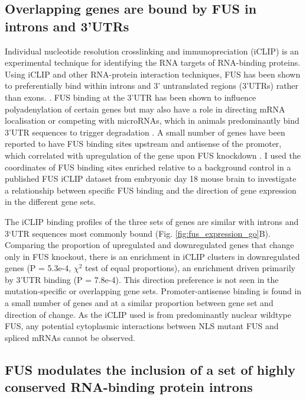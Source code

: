 \subsection{ Overlapping genes are bound by FUS in introns and 3'UTRs}

Individual nucleotide resolution crosslinking and immunopreciation (iCLIP) is an experimental technique for identifying the RNA targets of RNA-binding proteins. 
Using iCLIP and other RNA-protein interaction techniques, FUS has been shown to preferentially bind within introns and 3' untranslated regions (3'UTRs) rather than exons. \citep{Lagier-Tourenne2012-wa, Rogelj2012, Ishigaki2012, Masuda2015a, Kapeli2016}. 
FUS binding at the 3'UTR has been shown to influence polyadenylation of certain genes \citep{Masuda2015a} but may also have a role in directing mRNA localisation or competing with microRNAs, which in animals predominantly bind 3'UTR sequences to trigger degradation \citep{Lee1993,Carthew2009}.
A small number of genes have been reported to have FUS binding  sites upstream and antisense of the promoter, which correlated with upregulation of the gene upon FUS knockdown \citep{Ishigaki2012}.
I used the coordinates of FUS binding sites enriched relative to a background control in a published FUS iCLIP dataset from embryonic day 18 mouse brain \citep{Rogelj2012} to investigate a relationship between specific FUS binding and the direction of gene expression in the different gene sets.

The iCLIP binding profiles of the three sets of genes are similar with introns and 3`UTR sequences most commonly bound (Fig. \ref{fig:fus_expression_go}B).  
Comparing the proportion of upregulated and downregulated genes that change only in FUS knockout, there is an enrichment in iCLIP clusters in downregulated genes (P = 5.3e-4, $\chi^2$ test of equal proportions), an enrichment driven primarily by 3'UTR binding (P = 7.8e-4). 
This direction preference is not seen in the mutation-specific or overlapping gene sets.
Promoter-antisense binding is found in a small number of genes and at a similar proportion between gene set and direction of change.
As the iCLIP used is from predominantly nuclear wildtype FUS, any potential cytoplasmic interactions between NLS mutant FUS and spliced mRNAs cannot be observed.



\subsection{FUS modulates the inclusion of a set of highly conserved RNA-binding protein introns}

